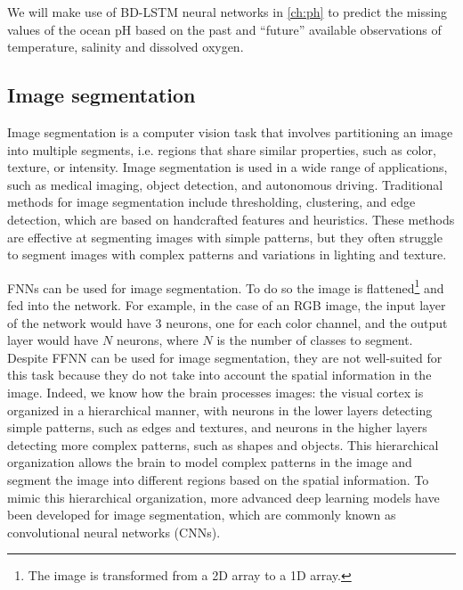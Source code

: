We will make use of BD-LSTM neural networks in \cref{ch:ph} to predict the
missing values of the ocean pH based on the past and ``future'' available
observations of temperature, salinity and dissolved oxygen.

\subsection{\label{sec: Image segmentation} Image segmentation}

Image segmentation is a computer vision task that involves partitioning an
image into multiple segments, i.e. regions that share similar properties, such
as color, texture, or intensity. Image segmentation is used in a wide range of
applications, such as medical imaging, object detection, and autonomous
driving. Traditional methods for image segmentation include thresholding,
clustering, and edge detection, which are based on handcrafted features and
heuristics. These methods are effective at segmenting images with simple
patterns, but they often struggle to segment images with complex patterns and
variations in lighting and texture.

FNNs can be used for image segmentation. To do so the image is
flattened\footnote{The image is transformed from a 2D array to a 1D array.} and
fed into the network. For example, in the case of an RGB image, the input layer
of the network would have 3 neurons, one for each color channel, and the output
layer would have $N$ neurons, where $N$ is the number of classes to segment.
Despite FFNN can be used for image segmentation, they are not well-suited for
this task because they do not take into account the spatial information in the
image. Indeed, we know how the brain processes images: the visual cortex is
organized in a hierarchical manner, with neurons in the lower layers detecting
simple patterns, such as edges and textures, and neurons in the higher layers
detecting more complex patterns, such as shapes and objects. This hierarchical
organization allows the brain to model complex patterns in the image and
segment the image into different regions based on the spatial information. To
mimic this hierarchical organization, more advanced deep learning models have
been developed for image segmentation, which are commonly known as
convolutional neural networks (CNNs).

